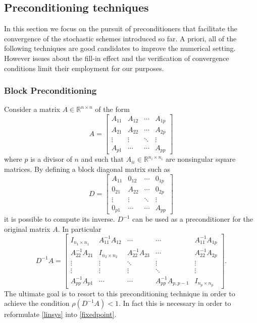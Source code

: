 \documentclass[a4paper,10pt]{article}
\begin{document}
\subsection{Preconditioning techniques}
In this section we focus on the pursuit of preconditioners that facilitate the 
convergence of the stochastic schemes introduced so far. A priori, all of the 
following techniques are good candidates to improve the numerical setting. 
However issues about the fill-in effect and the verification of convergence 
conditions limit their employment for our purposes.

\subsubsection*{Block Preconditioning}
Consider a matrix $A\in\mathbb{R}^{n\times n}$ of the form
\[
 A=\begin{bmatrix}A_{11} & A_{12} & \cdots & A_{1p}\\
    A_{21} & A_{22} & \cdots & A_{2p}\\
    \vdots & \vdots & \ddots & \vdots \\
    A_{p1} & \cdots & \cdots & A_{pp}
   \end{bmatrix}
\]
where $p$ is a divisor of $n$ and such that $A_{ii} \in \mathbb{R}^{n_i 
\times n_i}$ are nonsingular square matrices.
By defining a block diagonal matrix such as 
\[
 D=\begin{bmatrix}A_{11} & 0_{12} & \cdots & 0_{1p}\\
    0_{21} & A_{22} & \cdots & 0_{2p}\\
    \vdots & \vdots & \ddots & \vdots \\
    0_{p1} & \cdots & \cdots & A_{pp}
   \end{bmatrix}
\]
it is possible to compute its inverse. 
$D^{-1}$  can be used as a preconditioner for the original matrix $A$.
In particular 
\[
 D^{-1}A=\begin{bmatrix}I_{n_1\times n_1} & A_{11}^{-1}A_{12} & \cdots &
\cdots & A_{11}^{-1}A_{1p} \\
A_{22}^{-1}A_{21} & I_{n_2\times n_2} & A_{22}^{-1}A_{23} & 
\cdots & A_{22}^{-1}A_{2p}\\
\vdots & \vdots & \ddots & \vdots & \vdots\\
\vdots & \vdots & \vdots &\ddots & \vdots \\
A_{pp}^{-1}A_{p1} &  \cdots & \cdots& 
A_{pp}^{-1}A_{p,p-1} & I_{n_p \times n_p}
\end{bmatrix}.
\]
The ultimate goal is to resort to this preconditioning technique in order to 
achieve the condition $\rho(D^{-1}A)<1$. In fact this is necessary in order to 
reformulate \ref{linsys} into \ref{fixedpoint}.
\end{document}
